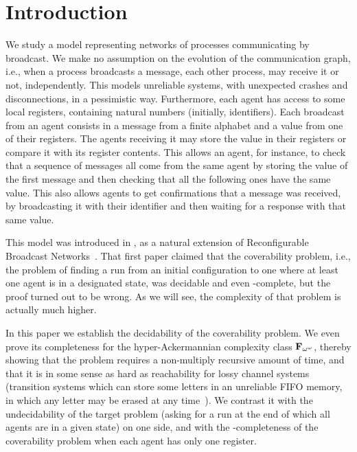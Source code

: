 \section{Introduction}

We study a model representing networks of processes communicating by broadcast. We make no assumption on the evolution of the communication graph, i.e., when a process broadcasts a message, each other process, may receive it or not, independently. This models unreliable systems, with unexpected crashes and disconnections, in a pessimistic way. 
Furthermore, each agent has access to some local registers, containing natural numbers (initially, identifiers). Each broadcast from an agent consists in a message from a finite alphabet and a value from one of their registers. The agents receiving it may store the value in their registers or compare it with its register contents. 
This allows an agent, for instance, to check that a sequence of messages all come from the same agent by storing the value of the first message and then checking that all the following ones have the same value.
This also allows agents to get confirmations that a message was received, by broadcasting it with their identifier and then waiting for a response with that same value.

This model was introduced in \cite{DelzannoST13}, as a natural extension of Reconfigurable Broadcast Networks~\cite{DelzannoSZ2010Adhoc}. That first paper claimed that the coverability problem, i.e., the problem of finding a run from an initial configuration to one where at least one agent is in a designated state, was decidable and even \PSPACE-complete, but the proof turned out to be wrong. As we will see, the complexity of that problem is actually much higher.

In this paper we establish the decidability of the coverability problem. We even prove its completeness for the hyper-Ackermannian complexity class $\mathbf{F}_{\omega^\omega}$, thereby showing that the problem requires a non-multiply recursive amount of time, and that it is in some sense as hard as reachability for lossy channel systems (transition systems which can store some letters in an unreliable FIFO memory, in which any letter may be erased at any time~\cite{AbdullaJ1996verif}). 
We contrast it with the undecidability of the target problem (asking for a run at the end of which all agents are in a given state) on one side, and with the \NP-completeness of the coverability problem when each agent has only one register. 

